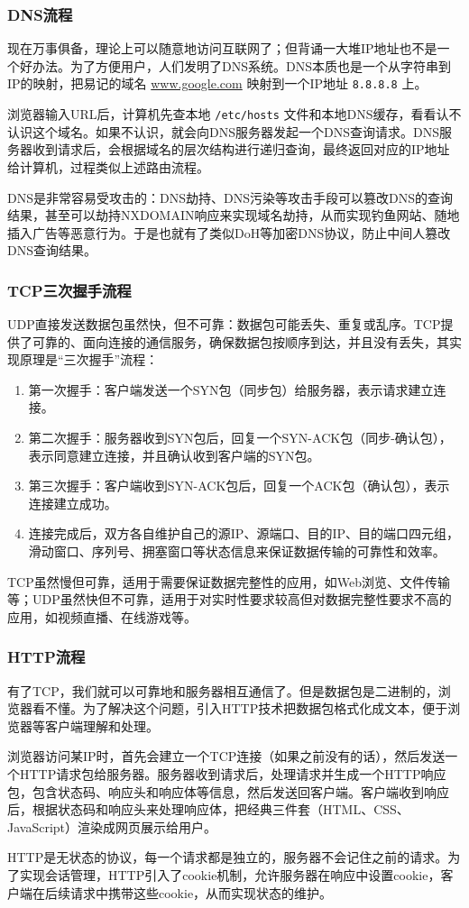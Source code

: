 \documentclass[fontset=none,aspectratio=1610]{ctexbeamer}
\begin{document}
\begin{frame}
    \frametitle{DNS流程}

    现在万事俱备，理论上可以随意地访问互联网了；但背诵一大堆IP地址也不是一个好办法。为了方便用户，人们发明了DNS系统。DNS本质也是一个从字符串到IP的映射，把易记的域名 \url{www.google.com} 映射到一个IP地址 \texttt{8.8.8.8} 上。

    浏览器输入URL后，计算机先查本地 \texttt{/etc/hosts} 文件和本地DNS缓存，看看认不认识这个域名。如果不认识，就会向DNS服务器发起一个DNS查询请求。DNS服务器收到请求后，会根据域名的层次结构进行递归查询，最终返回对应的IP地址给计算机，过程类似上述路由流程。

    DNS是非常容易受攻击的：DNS劫持、DNS污染等攻击手段可以篡改DNS的查询结果，甚至可以劫持NXDOMAIN响应来实现域名劫持，从而实现钓鱼网站、随地插入广告等恶意行为。于是也就有了类似DoH等加密DNS协议，防止中间人篡改DNS查询结果。

\end{frame}

\begin{frame}
    \frametitle{TCP三次握手流程}

    UDP直接发送数据包虽然快，但不可靠：数据包可能丢失、重复或乱序。TCP提供了可靠的、面向连接的通信服务，确保数据包按顺序到达，并且没有丢失，其实现原理是“三次握手”流程：
    \begin{enumerate}
        \item 第一次握手：客户端发送一个SYN包（同步包）给服务器，表示请求建立连接。
        \item 第二次握手：服务器收到SYN包后，回复一个SYN-ACK包（同步-确认包），表示同意建立连接，并且确认收到客户端的SYN包。
        \item 第三次握手：客户端收到SYN-ACK包后，回复一个ACK包（确认包），表示连接建立成功。
        \item 连接完成后，双方各自维护自己的源IP、源端口、目的IP、目的端口四元组，滑动窗口、序列号、拥塞窗口等状态信息来保证数据传输的可靠性和效率。
    \end{enumerate}
    TCP虽然慢但可靠，适用于需要保证数据完整性的应用，如Web浏览、文件传输等；UDP虽然快但不可靠，适用于对实时性要求较高但对数据完整性要求不高的应用，如视频直播、在线游戏等。

\end{frame}

\begin{frame}
    \frametitle{HTTP流程}

    有了TCP，我们就可以可靠地和服务器相互通信了。但是数据包是二进制的，浏览器看不懂。为了解决这个问题，引入HTTP技术把数据包格式化成文本，便于浏览器等客户端理解和处理。

    浏览器访问某IP时，首先会建立一个TCP连接（如果之前没有的话），然后发送一个HTTP请求包给服务器。服务器收到请求后，处理请求并生成一个HTTP响应包，包含状态码、响应头和响应体等信息，然后发送回客户端。客户端收到响应后，根据状态码和响应头来处理响应体，把经典三件套（HTML、CSS、JavaScript）渲染成网页展示给用户。

    HTTP是无状态的协议，每一个请求都是独立的，服务器不会记住之前的请求。为了实现会话管理，HTTP引入了cookie机制，允许服务器在响应中设置cookie，客户端在后续请求中携带这些cookie，从而实现状态的维护。

\end{frame}
\end{document}
